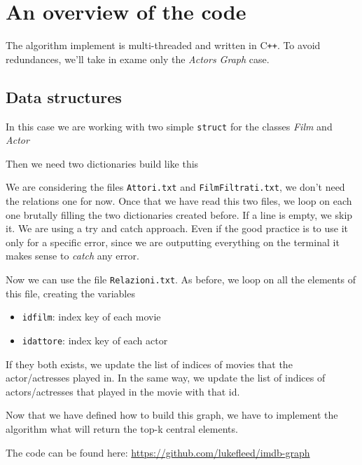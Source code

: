 \section{An overview of the code}
The algorithm implement is multi-threaded and written in C\texttt{++}. To avoid redundances, we'll take in exame only the \emph{Actors Graph} case.

\subsection{Data structures}
In this case we are working with two simple \texttt{struct} for the classes \emph{Film} and \emph{Actor}


\s
\nd Then we need two dictionaries build like this


\s
\nd We are considering the files \texttt{Attori.txt} and \texttt{FilmFiltrati.txt}, we don't need the relations one for now. Once that we have read this two files, we loop on each one brutally filling the two dictionaries created before. If a line is empty, we skip it. We are using a try and catch approach. Even if the good practice is to use it only for a specific error, since we are outputting everything on the terminal it makes sense to \emph{catch} any error.


\s

Now we can use the file \texttt{Relazioni.txt}. As before, we loop on all the elements of this file, creating the variables

\begin{itemize}
    \item \texttt{id\textunderscore film}: index key of each movie
    \item \texttt{id\textunderscore attore}: index key of each actor
\end{itemize}

\nd If they both exists, we update the list of indices of movies that the actor/actresses played in. In the same way, we update the list of indices of actors/actresses that played in the movie with that id.


\s
Now that we have defined how to build this graph, we have to implement the algorithm what will return the top-k central elements. \s

\nd The code can be found here: \url{https://github.com/lukefleed/imdb-graph}
\s
\begin{center}
\end{center}


